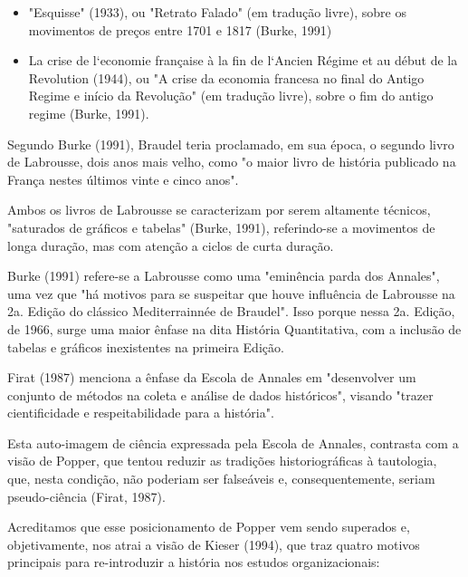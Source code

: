 \begin{itemize}
\item "Esquisse" (1933), ou "Retrato Falado" (em tradução livre), sobre os movimentos de preços entre 1701 e 1817  (Burke, 1991)
\item La crise de l`economie française à la fin de l`Ancien Régime et au début de la Revolution (1944), ou "A crise da economia francesa no final do Antigo Regime e início da Revolução" (em tradução livre), sobre o fim do antigo regime  (Burke, 1991).
\end{itemize}

Segundo  Burke (1991), Braudel teria proclamado, em sua época, o segundo livro de Labrousse, dois anos mais velho, como "o maior livro de história publicado na França nestes últimos vinte e cinco anos".

Ambos os livros de Labrousse se caracterizam por serem altamente técnicos, "saturados de gráficos e tabelas"  (Burke, 1991), referindo-se a movimentos de longa duração, mas com atenção a ciclos de curta duração.

Burke (1991) refere-se a Labrousse como uma "eminência parda dos Annales", uma vez que "há motivos para se suspeitar que houve influência de Labrousse na 2a. Edição do clássico Mediterrainnée de Braudel". Isso porque nessa 2a. Edição, de 1966, surge uma maior ênfase na dita História Quantitativa, com a inclusão de tabelas e gráficos inexistentes na primeira Edição.

Firat (1987) menciona a ênfase da Escola de Annales em "desenvolver um conjunto de métodos na coleta e análise de dados históricos", visando "trazer cientificidade e respeitabilidade para a história".

Esta auto-imagem de ciência expressada pela Escola de Annales, contrasta com a visão de Popper, que tentou reduzir as tradições historiográficas à tautologia, que, nesta condição, não poderiam ser falseáveis e, consequentemente, seriam pseudo-ciência  (Firat, 1987).

Acreditamos que esse posicionamento de Popper vem sendo superados e, objetivamente, nos atrai a visão de Kieser (1994), que traz quatro motivos principais para re-introduzir a história nos estudos organizacionais:


